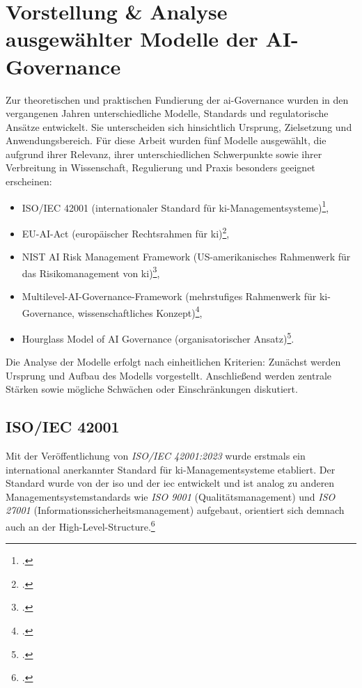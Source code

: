 \newpage
\section{Vorstellung \& Analyse ausgewählter Modelle der AI-Governance}
\label{sec:modellederaigovernance}
Zur theoretischen und praktischen Fundierung der \ac{ai}-Governance wurden in den vergangenen Jahren unterschiedliche Modelle, Standards und regulatorische Ansätze entwickelt.
Sie unterscheiden sich hinsichtlich Ursprung, Zielsetzung und Anwendungsbereich.
Für diese Arbeit wurden fünf Modelle ausgewählt, die aufgrund ihrer Relevanz, ihrer unterschiedlichen Schwerpunkte sowie ihrer Verbreitung in Wissenschaft, Regulierung und Praxis besonders geeignet erscheinen:
\begin{itemize}
    \item ISO/IEC 42001 (internationaler Standard für \ac{ki}-Managementsysteme)\footcite{isoISOIEC42001},
    \item EU-AI-Act (europäischer Rechtsrahmen für \ac{ki})\footcite{ europeanparliamentaryresearchserviceArtificialIntelligenceAct2024},
    \item NIST AI Risk Management Framework (US-amerikanisches Rahmenwerk für das Risikomanagement von \ac{ki})\footcite{nationalinstituteofstandardsandtechnologyAIRiskManagement2021},
    \item Multilevel-AI-Governance-Framework (mehrstufiges Rahmenwerk für \ac{ki}-Governance, wissenschaftliches Konzept)\footcite{choungMultilevelFrameworkAI2023},
    \item Hourglass Model of AI Governance (organisatorischer Ansatz)\footcite{mantymakiPDFPuttingAI2025}.
\end{itemize}
Die Analyse der Modelle erfolgt nach einheitlichen Kriterien: Zunächst werden Ursprung und Aufbau des Modells vorgestellt.
Anschließend werden zentrale Stärken sowie mögliche Schwächen oder Einschränkungen diskutiert.

\subsection{ISO/IEC 42001}
\label{subsec:isoiec42001}
Mit der Veröffentlichung von \textit{ISO/IEC 42001:2023} wurde erstmals ein international anerkannter Standard für \ac{ki}-Managementsysteme etabliert.
Der Standard wurde von der \ac{iso} und der \ac{iec} entwickelt und ist analog zu anderen Managementsystemstandards wie \textit{ISO 9001} (Qualitätsmanagement) und \textit{ISO 27001} (Informationssicherheitsmanagement) aufgebaut, orientiert sich demnach auch an der High-Level-Structure.\footcite[1]{isoISOIEC42001}

